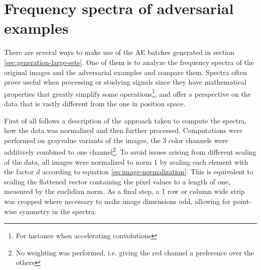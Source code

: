 \documentclass[11pt, a4paper]{article}
\begin{document}










\section{Frequency spectra of adversarial examples}
\label{sec:spectra}
There are several ways to make use of the AE batches generated in section \ref{sec:generation-large-sets}. One of them is to analyze the frequency spectra of the original images and the adversarial examples and compare them. Spectra often prove useful when processing or studying signals since they have mathematical properties that greatly simplify some operations\footnote{For instance when accelerating convolutions}, and offer a perspective on the data that is vastly different from the one in position space.

First of all follows a description of the approach taken to compute the spectra, how the data was normalized and then further processed. Computations were performed on grayvalue variants of the images, the 3 color channels were additively combined to one channel\footnote{No weighting was performed, i.e. giving the red channel a preference over the others}. To avoid issues arising from different scaling of the data, all images were normalized to norm $1$ by scaling each element with the factor $d$ according to equation \eqref{eq:image-normalization}. This is equivalent to scaling the flattened vector containing the pixel values to a length of one, measured by the euclidian norm. As a final step, a 1 row or column wide strip was cropped where necessary to make image dimensions odd, allowing for point-wise symmetry in the spectra.
\end{document}
